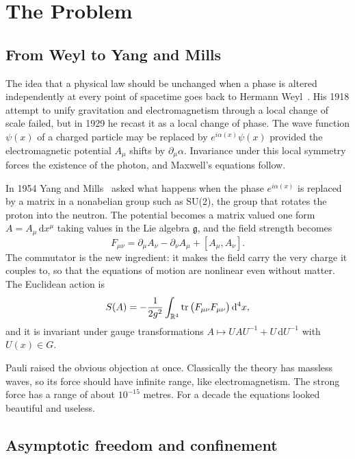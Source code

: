 \chapter{The Problem}\label{ch:problem}

\section{From Weyl to Yang and Mills}

The idea that a physical law should be unchanged when a phase is altered independently at every point of spacetime goes back to Hermann Weyl~\cite{We29}. His 1918 attempt to unify gravitation and electromagnetism through a local change of scale failed, but in 1929 he recast it as a local change of phase. The wave function $\psi(x)$ of a charged particle may be replaced by $e^{i\alpha(x)}\psi(x)$ provided the electromagnetic potential $A_\mu$ shifts by $\partial_\mu\alpha$. Invariance under this local symmetry forces the existence of the photon, and Maxwell's equations follow.

In 1954 Yang and Mills~\cite{YM54} asked what happens when the phase $e^{i\alpha(x)}$ is replaced by a matrix in a nonabelian group such as SU(2), the group that rotates the proton into the neutron. The potential becomes a matrix valued one form $A=A_\mu\,\mathrm dx^\mu$ taking values in the Lie algebra $\mathfrak g$, and the field strength becomes
\[
F_{\mu\nu}=\partial_\mu A_\nu-\partial_\nu A_\mu+[A_\mu,A_\nu].
\]
The commutator is the new ingredient: it makes the field carry the very charge it couples to, so that the equations of motion are nonlinear even without matter. The Euclidean action is
\[
S(A)=-\frac{1}{2g^2}\int_{\mathbb{R}^4}\operatorname{tr}\big(F_{\mu\nu}F_{\mu\nu}\big)\,\mathrm d^4x ,
\]
and it is invariant under gauge transformations $A\mapsto UAU^{-1}+U\,\mathrm dU^{-1}$ with $U(x)\in G$.

Pauli raised the obvious objection at once. Classically the theory has massless waves, so its force should have infinite range, like electromagnetism. The strong force has a range of about $10^{-15}$ metres. For a decade the equations looked beautiful and useless.

\section{Asymptotic freedom and confinement}

